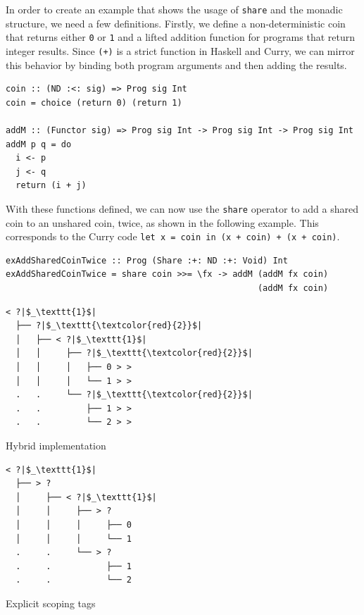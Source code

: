 \documentclass[a4paper, 11pt, fleqn, twoside, abstract=on]{scrreprt}
\newcommand{\hinl}[1]{\texttt{#1}}
\begin{document}
In order to create an example that shows the usage of \hinl{share} and the monadic structure, we need a few definitions.
Firstly, we define a non-deterministic coin that returns either \hinl{0} or \hinl{1} and a lifted addition function for programs that return integer results.
Since \hinl{(+)} is a strict function in Haskell and Curry, we can mirror this behavior by binding both program arguments and then adding the results.

\begin{verbatim}
coin :: (ND :<: sig) => Prog sig Int
coin = choice (return 0) (return 1)

addM :: (Functor sig) => Prog sig Int -> Prog sig Int -> Prog sig Int
addM p q = do
  i <- p 
  j <- q 
  return (i + j)
\end{verbatim}
\noindent
With these functions defined, we can now use the \hinl{share} operator to add a shared coin to an unshared coin, twice, as shown in the following example.
This corresponds to the Curry code \hinl{let x = coin in (x + coin) + (x + coin)}.

\begin{verbatim}
exAddSharedCoinTwice :: Prog (Share :+: ND :+: Void) Int
exAddSharedCoinTwice = share coin >>= \fx -> addM (addM fx coin) 
                                                  (addM fx coin)
\end{verbatim}

\vspace{0.32cm}

\begin{minipage}{.4 \linewidth}
\begin{verbatim}
< ?|$_\texttt{1}$|
  ├── ?|$_\texttt{\textcolor{red}{2}}$|
  │   ├── < ?|$_\texttt{1}$|
  │   │     ├── ?|$_\texttt{\textcolor{red}{2}}$|
  │   │     │   ├── 0 > >
  │   │     │   └── 1 > >
  .   .     └── ?|$_\texttt{\textcolor{red}{2}}$|
  .   .         ├── 1 > >
  .   .         └── 2 > >
\end{verbatim}
\begin{center}
Hybrid implementation
\end{center}
\end{minipage}
\hspace{.1 \linewidth}
\vline
\hspace{.1 \linewidth}
\begin{minipage}{.475 \linewidth}
\begin{verbatim}
< ?|$_\texttt{1}$|
  ├── > ? 
  │     ├── < ?|$_\texttt{1}$|
  │     │     ├── > ? 
  │     │     │     ├── 0
  │     │     │     └── 1
  .     .     └── > ? 
  .     .           ├── 1
  .     .           └── 2
\end{verbatim}
Explicit scoping tags
\end{minipage}
\end{document}
